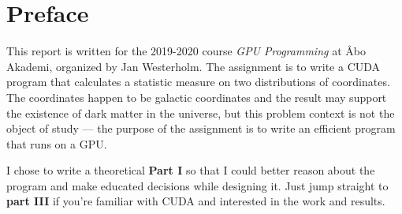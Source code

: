 \documentclass[a4paper,titlepage,12pt]{article}
\title{\xtitle}
\date{\xdate}
\author{\xauthor}
\begin{document}
\maketitle

\section*{Preface}

This report is written for the 2019-2020 course {\em GPU Programming} at Åbo Akademi, organized by Jan Westerholm.
The assignment is to write a CUDA program that calculates a statistic measure on two distributions of coordinates.
The coordinates happen to be galactic coordinates and the result may support the existence of dark matter in the universe, but this problem context is not the object of study --- the purpose of the assignment is to write an efficient program that runs on a GPU.

I chose to write a theoretical {\bf Part I} so that I could better reason about the program and make educated decisions while designing it.
Just jump straight to {\bf part III} if you're familiar with CUDA and interested in the work and results.
\end{document}
